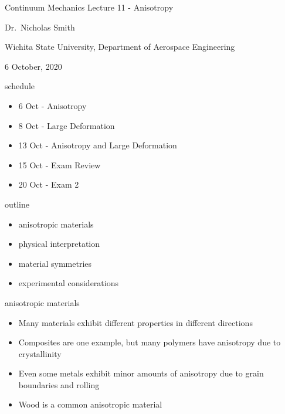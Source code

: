 \documentclass[
  letterpaper,
  ignorenonframetext,
  aspectratio=43,
  handout,
  12pt]{beamer}
\author{}
\date{}
\providecommand{\tightlist}{%
  \setlength{\itemsep}{0pt}\setlength{\parskip}{0pt}}
\providecommand{\tightlist}{%
\setlength{\itemsep}{0pt}\setlength{\parskip}{0pt}}
\begin{document}
\begin{frame}{Continuum Mechanics}
\protect\hypertarget{continuum-mechanics}{}
Lecture 11 - Anisotropy

Dr.~Nicholas Smith

Wichita State University, Department of Aerospace Engineering

6 October, 2020
\end{frame}

\begin{frame}{schedule}
\protect\hypertarget{schedule}{}
\begin{itemize}
\tightlist
\item
  6 Oct - Anisotropy
\item
  8 Oct - Large Deformation
\item
  13 Oct - Anisotropy and Large Deformation
\item
  15 Oct - Exam Review
\item
  20 Oct - Exam 2
\end{itemize}
\end{frame}

\begin{frame}{outline}
\protect\hypertarget{outline}{}
\begin{itemize}
\tightlist
\item
  anisotropic materials
\item
  physical interpretation
\item
  material symmetries
\item
  experimental considerations
\end{itemize}
\end{frame}

\begin{frame}{anisotropic materials}
\protect\hypertarget{anisotropic-materials}{}
\begin{itemize}
\tightlist
\item
  Many materials exhibit different properties in different directions
\item
  Composites are one example, but many polymers have anisotropy due to
  crystallinity
\item
  Even some metals exhibit minor amounts of anisotropy due to grain
  boundaries and rolling
\item
  Wood is a common anisotropic material
\end{itemize}
\end{frame}
\end{document}
